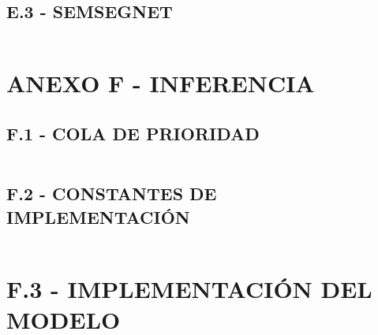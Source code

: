 \subsection*{E.3 - SEMSEGNET}
	\inputminted[frame=lines,
	baselinestretch=1,
	fontsize=\footnotesize,
	autogobble]{python}{codigos/apendices/semseg_train.py}
\section*{ANEXO F - INFERENCIA}
\subsection*{F.1 - COLA DE PRIORIDAD}
	\inputminted[frame=lines,
	baselinestretch=1,
	fontsize=\footnotesize,
	autogobble]{python}{codigos/apendices/priority_queue.py}
\subsection*{F.2 - CONSTANTES DE IMPLEMENTACIÓN}
	\inputminted[frame=lines,
	baselinestretch=1,
	fontsize=\footnotesize,
	autogobble]{python}{codigos/apendice_d/constants.py}
\section*{F.3 - IMPLEMENTACIÓN DEL MODELO}
	\inputminted[frame=lines,
	baselinestretch=1,
	fontsize=\footnotesize,
	autogobble]{python}{codigos/apendice_e/inferencia.py}

